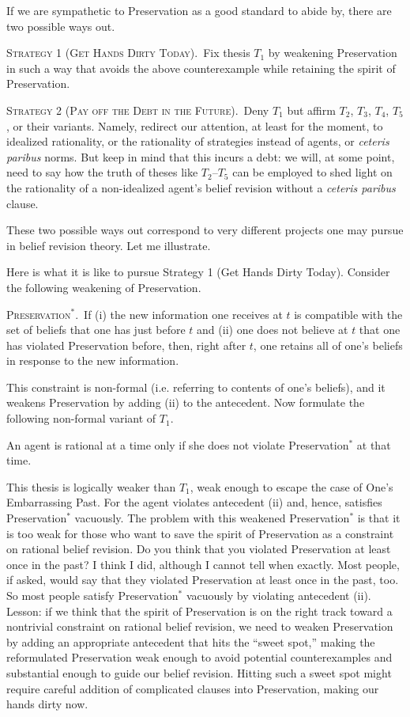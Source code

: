 If we are sympathetic to Preservation as a good standard to abide by, there are two possible ways out. \op

	\xm \textsc{Strategy 1 (Get Hands Dirty Today).}\, Fix thesis $T_1$ by weakening Preservation in such a way that avoids the above counterexample while retaining the spirit of Preservation.

	\xm \textsc{Strategy 2 (Pay off the Debt in the Future).}\, Deny $T_1$ but affirm $T_2$, $T_3$, $T_4$, $T_5$, or their variants. Namely, redirect our attention, at least for the moment, to idealized rationality, or the rationality of strategies instead of agents, or {\em ceteris paribus} norms. But keep in mind that this incurs a debt: we will, at some point, need to say how the truth of theses like $T_2$--$T_5$ can be employed to shed light on the rationality of a non-idealized agent's belief revision without a {\em ceteris paribus} clause.

\ed These two possible ways out correspond to very different projects one may pursue in belief revision theory. Let me illustrate.

Here is what it is like to pursue Strategy 1 (Get Hands Dirty Today). Consider the following weakening of Preservation. \op

	\xm \textsc{Preservation$^{*}$.}\, If (i) the new information one receives at $t$ is compatible with the set of beliefs that one has just before $t$ and (ii) one does not believe at $t$ that one has violated Preservation before, then, right after $t$, one retains all of one's beliefs in response to the new information. 

\ed This constraint is non-formal (i.e. referring to contents of one's beliefs), and it weakens Preservation by adding (ii) to the antecedent. Now formulate the following non-formal variant of $T_1$. \op

	\xm 
	\op
	\im[($T^{*}_1$)] An agent is rational at a time only if she does not violate Preservation$^{*}$ at that time.
	\ed

\ed This thesis is logically weaker than $T_1$, weak enough to escape the case of One's Embarrassing Past. For the agent violates antecedent (ii) and, hence, satisfies Preservation$^{*}$ vacuously. The problem with this weakened Preservation$^{*}$ is that it is too weak for those who want to save the spirit of Preservation as a constraint on rational belief revision. Do you think that you violated Preservation at least once in the past? I think I did, although I cannot tell when exactly. Most people, if asked, would say that they violated Preservation at least once in the past, too. So most people satisfy Preservation$^{*}$ vacuously by violating antecedent (ii). Lesson: if we think that the spirit of Preservation is on the right track toward a nontrivial constraint on rational belief revision, we need to weaken Preservation by adding an appropriate antecedent that hits the ``sweet spot,'' making the reformulated Preservation weak enough to avoid potential counterexamples and substantial enough to guide our belief revision. Hitting such a sweet spot might require careful addition of complicated clauses into Preservation, making our hands dirty now.

